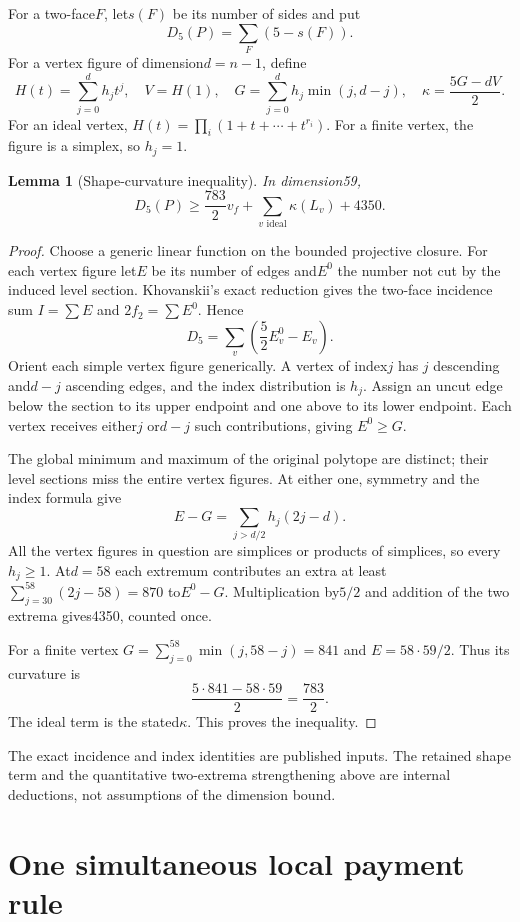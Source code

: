 \documentclass[11pt]{article}
\newtheorem{lemma}[theorem]{Lemma}
\theoremstyle{remark}\newtheorem{remark}[theorem]{Remark}
\newcommand{\Dfive}{D_5}
\begin{document}
For a two-face$F$, let$s(F)$ be its number of sides and put
\[
 \Dfive(P)=\sum_F(5-s(F)).
\]
For a vertex figure of dimension$d=n-1$, define
\[
 H(t)=\sum_{j=0}^d h_jt^j,\quad
 V=H(1),\quad G=\sum_{j=0}^d h_j\min(j,d-j),\quad
 \kappa=\frac{5G-dV}{2}.
\]
For an ideal vertex, $H(t)=\prod_i(1+t+\cdots+t^{r_i})$.
For a finite vertex, the figure is a simplex, so $h_j=1$.

\begin{lemma}[Shape-curvature inequality]\label{lem:curvature}
In dimension59,
\[
 \Dfive(P)\geq\frac{783}{2}v_f+\sum_{v\text{ ideal}}\kappa(L_v)+4350.
\]
\end{lemma}
\begin{proof}
Choose a generic linear function on the bounded projective closure.
For each vertex figure let$E$ be its number of edges and$E^0$ the number
not cut by the induced level section. Khovanskii's exact reduction gives
the two-face incidence sum $I=\sum E$ and $2f_2=\sum E^0$. Hence
\[
 \Dfive=\sum_v\left(\frac52E_v^0-E_v\right).
\]
Orient each simple vertex figure generically. A vertex of index$j$ has
$j$ descending and$d-j$ ascending edges, and the index distribution is
$h_j$. Assign an uncut edge below the section to its upper endpoint and
one above to its lower endpoint. Each vertex receives either$j$ or$d-j$
such contributions, giving $E^0\geq G$.

The global minimum and maximum of the original polytope are distinct;
their level sections miss the entire vertex figures. At either one,
symmetry and the index formula give
\[
 E-G=\sum_{j>d/2}h_j(2j-d).
\]
All the vertex figures in question are simplices or products of
simplices, so every$h_j\geq1$. At$d=58$ each extremum contributes an
extra at least
$\sum_{j=30}^{58}(2j-58)=870$ to$E^0-G$.
Multiplication by$5/2$ and addition of the two extrema gives4350,
counted once.

For a finite vertex $G=\sum_{j=0}^{58}\min(j,58-j)=841$ and
$E=58\cdot59/2$. Thus its curvature is
\[
 \frac{5\cdot841-58\cdot59}{2}=\frac{783}{2}.
\]
The ideal term is the stated$\kappa$. This proves the inequality.
\end{proof}

The exact incidence and index identities are published inputs.
The retained shape term and the quantitative two-extrema strengthening
above are internal deductions, not assumptions of the dimension bound.

\section{One simultaneous local payment rule}
\end{document}
